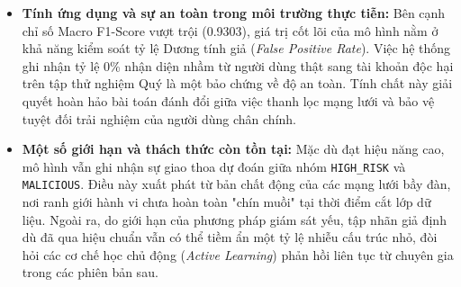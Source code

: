 \begin{itemize}[label={--}, itemsep=1pt]
    \item \textbf{Tính ứng dụng và sự an toàn trong môi trường thực tiễn:} Bên cạnh chỉ số Macro F1-Score vượt trội (0.9303), giá trị cốt lõi của mô hình nằm ở khả năng kiểm soát tỷ lệ Dương tính giả (\textit{False Positive Rate}). Việc hệ thống ghi nhận tỷ lệ 0\% nhận diện nhầm từ người dùng thật sang tài khoản độc hại trên tập thử nghiệm Quý là một bảo chứng về độ an toàn. Tính chất này giải quyết hoàn hảo bài toán đánh đổi giữa việc thanh lọc mạng lưới và bảo vệ tuyệt đối trải nghiệm của người dùng chân chính.
    
    \item \textbf{Một số giới hạn và thách thức còn tồn tại:} Mặc dù đạt hiệu năng cao, mô hình vẫn ghi nhận sự giao thoa dự đoán giữa nhóm \texttt{HIGH\_RISK} và \texttt{MALICIOUS}. Điều này xuất phát từ bản chất động của các mạng lưới bầy đàn, nơi ranh giới hành vi chưa hoàn toàn "chín muồi" tại thời điểm cắt lớp dữ liệu. Ngoài ra, do giới hạn của phương pháp giám sát yếu, tập nhãn giả định dù đã qua hiệu chuẩn vẫn có thể tiềm ẩn một tỷ lệ nhiễu cấu trúc nhỏ, đòi hỏi các cơ chế học chủ động (\textit{Active Learning}) phản hồi liên tục từ chuyên gia trong các phiên bản sau.
\end{itemize}